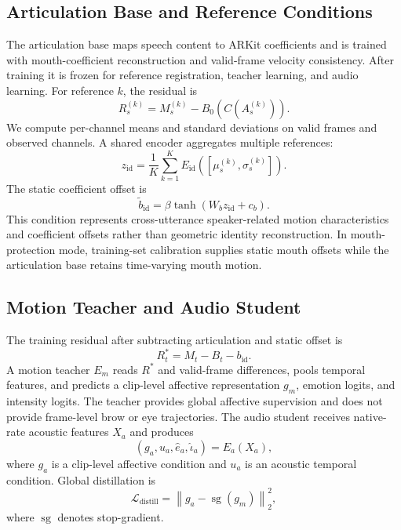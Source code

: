 \documentclass[conference]{IEEEtran}
\begin{document}
\subsection{Articulation Base and Reference Conditions}
The articulation base maps speech content to ARKit coefficients and is trained with mouth-coefficient reconstruction and valid-frame velocity consistency. After training it is frozen for reference registration, teacher learning, and audio learning. For reference $k$, the residual is
\begin{equation}
R_s^{(k)}=M_s^{(k)}-B_0(C(A_s^{(k)})).
\end{equation}
We compute per-channel means and standard deviations on valid frames and observed channels. A shared encoder aggregates multiple references:
\begin{equation}
z_{\mathrm{id}}=\frac{1}{K}\sum_{k=1}^{K}E_{\mathrm{id}}\left([\mu_s^{(k)},\sigma_s^{(k)}]\right).
\end{equation}
The static coefficient offset is
\begin{equation}
\tilde b_{\mathrm{id}}=\beta\tanh(W_bz_{\mathrm{id}}+c_b).
\end{equation}
This condition represents cross-utterance speaker-related motion characteristics and coefficient offsets rather than geometric identity reconstruction. In mouth-protection mode, training-set calibration supplies static mouth offsets while the articulation base retains time-varying mouth motion.

\subsection{Motion Teacher and Audio Student}
The training residual after subtracting articulation and static offset is
\begin{equation}
R_t^*=M_t-B_t-b_{\mathrm{id}}.
\end{equation}
A motion teacher $E_m$ reads $R^*$ and valid-frame differences, pools temporal features, and predicts a clip-level affective representation $g_m$, emotion logits, and intensity logits. The teacher provides global affective supervision and does not provide frame-level brow or eye trajectories. The audio student receives native-rate acoustic features $X_a$ and produces
\begin{equation}
(g_a,u_a,\hat e_a,\hat\iota_a)=E_a(X_a),
\end{equation}
where $g_a$ is a clip-level affective condition and $u_a$ is an acoustic temporal condition. Global distillation is
\begin{equation}
\mathcal{L}_{\mathrm{distill}}=\left\|g_a-\operatorname{sg}(g_m)\right\|_2^2,
\end{equation}
where $\operatorname{sg}$ denotes stop-gradient.
\end{document}
